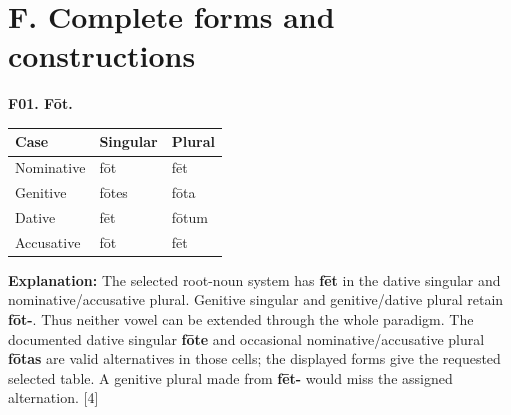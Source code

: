 \clearpage
\section*{F. Complete forms and constructions}

\par\begin{minipage}{\linewidth}\raggedright
\textbf{F01. Fōt.}

\par\begingroup
\fontsize{10.5}{13.2}\selectfont
\setlength{\LTleft}{0pt}\setlength{\LTright}{\fill}
\noindent
\begin{tabular}{@{}>{\raggedright\arraybackslash}p{39.46mm}>{\raggedright\arraybackslash}p{39.46mm}>{\raggedright\arraybackslash}p{39.46mm}@{}}
\toprule
\textbf{Case} & \textbf{Singular} & \textbf{Plural} \\
\midrule
Nominative & fōt & fēt \\
Genitive & fōtes & fōta \\
Dative & fēt & fōtum \\
Accusative & fōt & fēt \\
\bottomrule
\end{tabular}
\par\endgroup

\textbf{Explanation:} The selected root-noun system has \textbf{fēt} in the dative singular and nominative/\allowbreak{}accusative plural. Genitive singular and genitive/\allowbreak{}dative plural retain \textbf{fōt-}. Thus neither vowel can be extended through the whole paradigm. The documented dative singular \textbf{fōte} and occasional nominative/\allowbreak{}accusative plural \textbf{fōtas} are valid alternatives in those cells; the displayed forms give the requested selected table. A genitive plural made from \textbf{fēt-} would miss the assigned alternation. [4]

\end{minipage}\par\addvspace{4pt}

